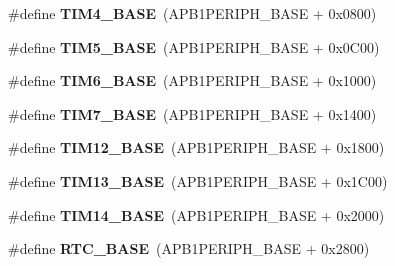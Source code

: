\begin{DoxyCompactItemize}
\item 
\hypertarget{group___peripheral__memory__map_ga56e2d44b0002f316527b8913866a370d}{\#define {\bfseries T\-I\-M4\-\_\-\-B\-A\-S\-E}~(A\-P\-B1\-P\-E\-R\-I\-P\-H\-\_\-\-B\-A\-S\-E + 0x0800)}\label{group___peripheral__memory__map_ga56e2d44b0002f316527b8913866a370d}

\item 
\hypertarget{group___peripheral__memory__map_ga3e1671477190d065ba7c944558336d7e}{\#define {\bfseries T\-I\-M5\-\_\-\-B\-A\-S\-E}~(A\-P\-B1\-P\-E\-R\-I\-P\-H\-\_\-\-B\-A\-S\-E + 0x0\-C00)}\label{group___peripheral__memory__map_ga3e1671477190d065ba7c944558336d7e}

\item 
\hypertarget{group___peripheral__memory__map_ga8268ec947929f192559f28c6bf7d1eac}{\#define {\bfseries T\-I\-M6\-\_\-\-B\-A\-S\-E}~(A\-P\-B1\-P\-E\-R\-I\-P\-H\-\_\-\-B\-A\-S\-E + 0x1000)}\label{group___peripheral__memory__map_ga8268ec947929f192559f28c6bf7d1eac}

\item 
\hypertarget{group___peripheral__memory__map_ga0ebf54364c6a2be6eb19ded6b18b6387}{\#define {\bfseries T\-I\-M7\-\_\-\-B\-A\-S\-E}~(A\-P\-B1\-P\-E\-R\-I\-P\-H\-\_\-\-B\-A\-S\-E + 0x1400)}\label{group___peripheral__memory__map_ga0ebf54364c6a2be6eb19ded6b18b6387}

\item 
\hypertarget{group___peripheral__memory__map_ga33dea32fadbaecea161c2ef7927992fd}{\#define {\bfseries T\-I\-M12\-\_\-\-B\-A\-S\-E}~(A\-P\-B1\-P\-E\-R\-I\-P\-H\-\_\-\-B\-A\-S\-E + 0x1800)}\label{group___peripheral__memory__map_ga33dea32fadbaecea161c2ef7927992fd}

\item 
\hypertarget{group___peripheral__memory__map_gad20f79948e9359125a40bbf6ed063590}{\#define {\bfseries T\-I\-M13\-\_\-\-B\-A\-S\-E}~(A\-P\-B1\-P\-E\-R\-I\-P\-H\-\_\-\-B\-A\-S\-E + 0x1\-C00)}\label{group___peripheral__memory__map_gad20f79948e9359125a40bbf6ed063590}

\item 
\hypertarget{group___peripheral__memory__map_ga862855347d6e1d92730dfe17ee8e90b8}{\#define {\bfseries T\-I\-M14\-\_\-\-B\-A\-S\-E}~(A\-P\-B1\-P\-E\-R\-I\-P\-H\-\_\-\-B\-A\-S\-E + 0x2000)}\label{group___peripheral__memory__map_ga862855347d6e1d92730dfe17ee8e90b8}

\item 
\hypertarget{group___peripheral__memory__map_ga4265e665d56225412e57a61d87417022}{\#define {\bfseries R\-T\-C\-\_\-\-B\-A\-S\-E}~(A\-P\-B1\-P\-E\-R\-I\-P\-H\-\_\-\-B\-A\-S\-E + 0x2800)}\label{group___peripheral__memory__map_ga4265e665d56225412e57a61d87417022}


\end{DoxyCompactItemize}
